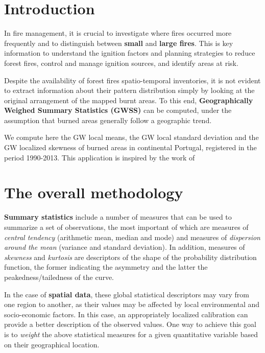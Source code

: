 \documentclass[
]{book}
\theoremstyle{definition}
\theoremstyle{definition}
\theoremstyle{definition}
\theoremstyle{definition}
\theoremstyle{remark}
\begin{document}
\hypertarget{introduction}{%
\section{Introduction}\label{introduction}}

In fire management, it is crucial to investigate where fires occurred more frequently and to distinguish between \textbf{small} and \textbf{large fires}.
This is key information to understand the ignition factors and planning strategies to reduce forest fires, control and manage ignition sources, and identify areas at risk.

Despite the availability of forest fires spatio-temporal inventories, it is not evident to extract information about their pattern distribution simply by looking at the original arrangement of the mapped burnt areas.
To this end, \textbf{Geographically Weighed Summary Statistics (GWSS)} can be computed, under the assumption that burned areas generally follow a geographic trend.

We compute here the GW local means, the GW local standard deviation and the GW localized skewness of burned areas in continental Portugal, registered in the period 1990-2013.
This application is inspired by the work of \citep{tonini_evolution_2017}

\hypertarget{the-overall-methodology}{%
\section{The overall methodology}\label{the-overall-methodology}}

\textbf{Summary statistics} include a number of measures that can be used to summarize a set of observations, the most important of which are measures of \emph{central tendency} (arithmetic mean, median and mode) and measures of \emph{dispersion around the mean} (variance and standard deviation).
In addition, measures of \emph{skewness} and \emph{kurtosis} are descriptors of the shape of the probability distribution function, the former indicating the asymmetry and the latter the peakedness/tailedness of the curve.

In the case of \textbf{spatial data}, these global statistical descriptors may vary from one region to another, as their values may be affected by local environmental and socio-economic factors.
In this case, an appropriately localized calibration can provide a better description of the observed values.
One way to achieve this goal is to \emph{weight} the above statistical measures for a given quantitative variable based on their geographical location.
\end{document}
